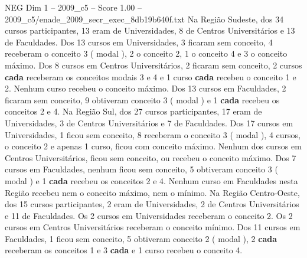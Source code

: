 \begin{textsample}{NEG Dim 1 – 2009\_c5 – Score 1.00 – 2009\_c5/enade\_2009\_secr\_exec\_8db19b640f.txt}
Na Região Sudeste, dos 34 cursos participantes, 13 eram de Universidades, 8 de Centros Universitários e 13 de Faculdades.
Dos 13 cursos em Universidades, 3 ficaram sem conceito, 4 receberam o conceito 3 ( modal ), 2 o conceito 2, 1 o conceito 4 e 3 o conceito máximo.
Dos 8 cursos em Centros Universitários, 2 ficaram sem conceito, 2 cursos \textbf{cada} receberam os conceitos modais 3 e 4 e 1 curso \textbf{cada} recebeu o conceito 1 e 2.
Nenhum curso recebeu o conceito máximo.
Dos 13 cursos em Faculdades, 2 ficaram sem conceito, 9 obtiveram conceito 3 ( modal ) e 1 \textbf{cada} recebeu os conceitos 2 e 4.
Na Região Sul, dos 27 cursos participantes, 17 eram de Universidades, 3 de Centros Universitários e 7 de Faculdades.
Dos 17 cursos em Universidades, 1 ficou sem conceito, 8 receberam o conceito 3 ( modal ), 4 cursos, o conceito 2 e apenas 1 curso, ficou com conceito máximo.
Nenhum dos cursos em Centros Universitários, ficou sem conceito, ou recebeu o conceito máximo.
Dos 7 cursos em Faculdades, nenhum ficou sem conceito, 5 obtiveram conceito 3 ( modal ) e 1 \textbf{cada} recebeu os conceitos 2 e 4.
Nenhum curso em Faculdades nesta Região recebeu nem o conceito máximo, nem o mínimo.
Na Região Centro-Oeste, dos 15 cursos participantes, 2 eram de Universidades, 2 de Centros Universitários e 11 de Faculdades.
Os 2 cursos em Universidades receberam o conceito 2.
Os 2 cursos em Centros Universitários receberam o conceito mínimo.
Dos 11 cursos em Faculdades, 1 ficou sem conceito, 5 obtiveram conceito 2 ( modal ), 2 \textbf{cada} receberam os conceitos 1 e 3 \textbf{cada} e 1 curso recebeu o conceito 4.

\end{textsample}
